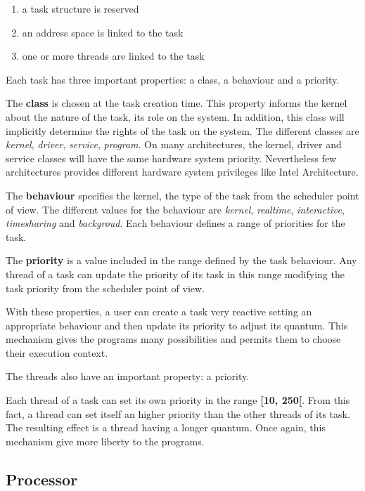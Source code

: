 \begin{multicols}{2}
\begin{enumerate}

\item a task structure is reserved
\item an address space is linked to the task
\item one or more threads are linked to the task

\end{enumerate}

Each task has three important properties: a class, a behaviour and a priority.

The \textbf{class} is chosen at the task creation time. This property
informs the kernel about the nature of the task, its role on the system.
In addition, this class will implicitly determine the rights of the task
on the system. The different classes are \textit{kernel}, \textit{driver},
\textit{service}, \textit{program}. On many architectures, the kernel, driver
and service classes will have the same hardware system priority.
Nevertheless few architectures provides different hardware system privileges
like Intel Architecture.

The \textbf{behaviour} specifies the kernel, the type of the task from the
scheduler point of view. The different values for the behaviour are
\textit{kernel}, \textit{realtime}, \textit{interactive}, \textit{timesharing}
and \textit{backgroud}. Each behaviour defines a range of priorities for the
task.

The \textbf{priority} is a value included in the range defined by the
task behaviour. Any thread of a task can update the priority of its
task in this range modifying the task priority from the scheduler
point of view.

With these properties, a user can create a task very reactive setting an
appropriate behaviour and then update its priority to adjust its quantum.
This mechanism gives the programs many possibilities and permits them to
choose their execution context.

The threads also have an important property: a priority.

Each thread of a task can set its own priority in the range \textbf{[10, 250[}.
From this fact, a thread can set itself an higher priority than the other
threads of its task. The resulting effect is a thread having a longer quantum.
Once again, this mechanism give more liberty to the programs.

\subsection{Processor}


\end{multicols}
